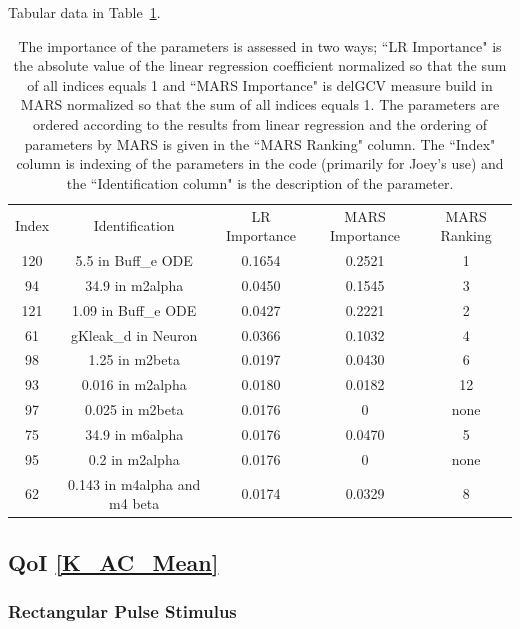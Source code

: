 \documentclass[12pt]{article}
\numberwithin{equation}{section}
\begin{document}
Tabular data in Table~\ref{qoi_K_AC_Max_ex}.

\begin{table}[h]
\centering
\begin{tabular}{ccccc}
Index & Identification & LR Importance & MARS Importance & MARS Ranking \\
120 & 5.5 in Buff\_e ODE & 0.1654 & 0.2521 & 1\\
94 & 34.9 in m2alpha & 0.0450 & 0.1545 & 3\\
121 & 1.09 in Buff\_e ODE &  0.0427 & 0.2221 & 2\\
61 & gKleak\_d in Neuron & 0.0366 & 0.1032 & 4\\
98 & 1.25 in m2beta & 0.0197 & 0.0430 & 6\\
93 & 0.016 in m2alpha & 0.0180 & 0.0182 & 12\\
97 & 0.025 in m2beta & 0.0176 &  0 & none\\
75 & 34.9 in m6alpha & 0.0176 & 0.0470 & 5\\
95 & 0.2 in m2alpha & 0.0176 & 0 & none\\
62 & 0.143 in m4alpha and m4 beta &  0.0174 & 0.0329 & 8\\
\end{tabular}
\caption{The importance of the parameters is assessed in two ways; ``LR Importance" is the absolute value of the linear regression coefficient normalized so that the sum of all indices equals 1 and ``MARS Importance" is delGCV measure build in MARS normalized so that the sum of all indices equals 1. The parameters are ordered according to the results from linear regression and the ordering of parameters by MARS is given in the ``MARS Ranking" column. The ``Index" column is indexing of the parameters in the code (primarily for Joey's use) and the ``Identification column" is the description of the parameter.}
\label{qoi_K_AC_Max_ex}
\end{table}

\newpage
\subsection{QoI \eqref{K_AC_Mean}}

\subsubsection{Rectangular Pulse Stimulus}
\end{document}
